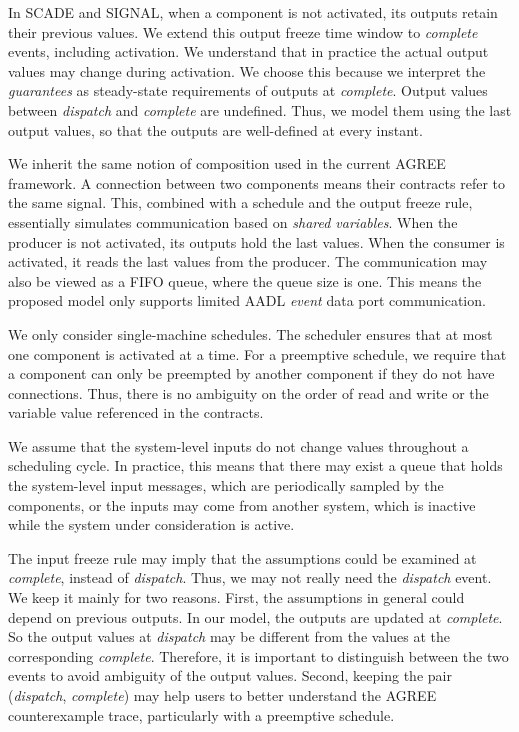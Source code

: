 In SCADE and SIGNAL, when a component is not activated, its outputs retain their previous values. We extend this output freeze time window to \emph{complete} events, including activation. We understand that in practice the actual output values may change during activation. We choose this because we interpret the \emph{guarantees} as steady-state requirements of outputs at \emph{complete}. Output values between \textit{dispatch} and \textit{complete} are undefined. Thus, we model them using the last output values, so that the outputs are well-defined at every instant.

We inherit the same notion of composition used in the current AGREE framework. A connection between two components means their contracts refer to the same signal. 
This, combined with a schedule and the output freeze rule, essentially simulates communication based on \emph{shared variables}. When the producer is not activated, its outputs hold the last values. When the consumer is activated, it reads the last values from the producer. The communication may also be viewed as a FIFO queue, where the queue size is one. %
This means the proposed model only supports limited AADL \textit{event} data port communication.

We only consider single-machine schedules. The scheduler ensures that at most one component is activated at a time. For a preemptive schedule, we require that a component can only be preempted by another component if they do not have connections. Thus, there is no ambiguity on the order of read and write or the variable value referenced in the contracts.

We assume that the system-level inputs do not change values throughout a scheduling cycle. In practice, this means that there may exist a queue that holds the system-level input messages, which are periodically sampled by the components, or the inputs may come from another system, which is inactive while the system under consideration is active.

The input freeze rule may imply that the assumptions could be examined at \emph{complete}, instead of \emph{dispatch}. Thus, we may not really need the \emph{dispatch} event. We keep it mainly for two reasons. First, the assumptions in general could depend on previous outputs. In our model, the outputs are updated at \emph{complete}. So the output values at \emph{dispatch} may be different from the values at the corresponding \emph{complete}. Therefore, it is important to distinguish between the two events to avoid ambiguity of the output values. Second, keeping the pair (\emph{dispatch}, \emph{complete}) may help users to better understand the AGREE counterexample trace, particularly with a preemptive schedule.

